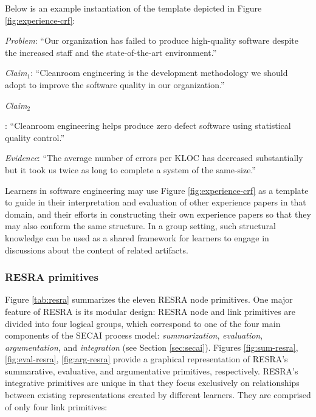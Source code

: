 Below is an example instantiation of the template depicted in Figure
\ref{fig:experience-crf}:

\begin{itemize}
\item {{\it Problem\/}: ``Our organization has failed to produce
  high-quality software despite the increased staff and the
  state-of-the-art environment.''
  
\item {\it Claim\(_{1}\)\/}: ``Cleanroom engineering is the development
  methodology we should adopt to improve the software quality in our
  organization.''
  
\item \it Claim\(_{2} \)\/}: ``Cleanroom engineering helps produce zero
  defect software using statistical quality control.''
  
\item {\it Evidence\/}: ``The average number of errors per KLOC has
  decreased substantially but it took us twice as long to complete a
  system of the same-size.''
\end{itemize}

Learners in software engineering may use Figure \ref{fig:experience-crf} as
a template to guide in their interpretation and evaluation of other
experience papers in that domain, and their efforts in constructing their
own experience papers so that they may also conform the same structure. In
a group setting, such structural knowledge can be used as a shared
framework for learners to engage in discussions about the content of
related artifacts.


\subsubsection{RESRA primitives}

Figure \ref{tab:resra} summarizes the eleven RESRA node primitives. One
major feature of RESRA is its modular design: RESRA node and link
primitives are divided into four logical groups, which correspond to one of
the four main components of the SECAI process model: {\it summarization\/},
{\it evaluation\/}, {\it argumentation\/}, and {\it integration\/} (see
Section \ref{sec:secai}). Figures \ref{fig:sum-resra},
\ref{fig:eval-resra}, \ref{fig:arg-resra} provide a graphical
representation of RESRA's summarative, evaluative, and argumentative
primitives, respectively. RESRA's integrative primitives are unique in that
they focus exclusively on relationships between existing representations
created by different learners. They are comprised of only four link
primitives:

